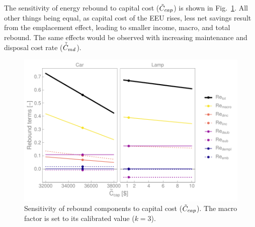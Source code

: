 \documentclass[12pt]{article}\usepackage[]{graphicx}\usepackage[]{xcolor}
\makeatletter
\def\maxwidth{ %
  \ifdim\Gin@nat@width>\linewidth
    \linewidth
  \else
    \Gin@nat@width
  \fi
}
\newenvironment{knitrout}{}{} %
\makeatother
\begin{document}
The sensitivity of energy rebound
to capital cost ($\amacro{C}_{cap}$) is shown
in Fig.~\ref{fig:all_Re_terms_C_cap_graph}.
All other things being equal,
as capital cost of the EEU rises, 
less net savings result from the emplacement effect,
leading to smaller income, macro, and total rebound.
The same effects would be observed
with increasing maintenance and disposal cost rate ($\tilde{\dot{C}}_{md}$).


\begin{knitrout}
\color{fgcolor}\begin{figure}

{\centering \includegraphics[width=\maxwidth]{figure/all_Re_terms_C_cap_graph-1} 

}

\caption[Sensitivity of rebound components to capital cost ($\amacro{C}_{cap}$)]{Sensitivity of rebound components to capital cost ($\amacro{C}_{cap}$). The macro factor is set to its calibrated value ($k = 3$).}\label{fig:all_Re_terms_C_cap_graph}
\end{figure}

\end{knitrout}


\end{document}
